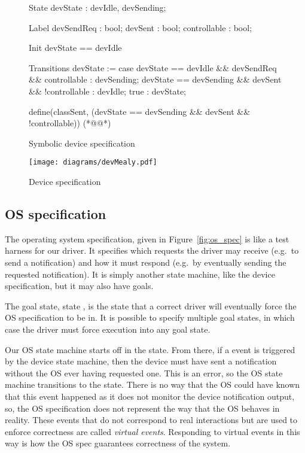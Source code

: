\begin{figure}
\centering
\begin{asllisting}
State
devState : {devIdle, devSending};

Label
devSendReq   : bool;
devSent      : bool;
controllable : bool;

Init
devState == devIdle

Transitions
devState := case {
    devState == devIdle && devSendReq && controllable  : devSending;
    devState == devSending && devSent && !controllable : devIdle;
    true                                               : devState;
}

define(classSent, (devState == devSending && devSent && !controllable)) (*@\label{fig:dev_spec:l:output}@*)

\end{asllisting}
\caption{Symbolic device specification}
\label{fig:dev_spec_asl}
\end{figure}

\begin{figure}
\centering
\texttt{[image: diagrams/devMealy.pdf]}
\caption{Device specification}
\label{fig:dev_spec_mealy}
\end{figure}

\subsection{OS specification}

The operating system specification, given in Figure~\ref{fig:os_spec} is like a test harness for our driver. It specifies which requests the driver may receive (e.g.\ to send a notification) and how it must respond (e.g.\ by eventually sending the requested notification). It is simply another state machine, like the device specification, but it may also have goals.

The goal state, state , is the state that a correct driver will eventually force the OS specification to be in. It is possible to specify multiple goal states, in which case the driver must force execution into any goal state.

Our OS state machine starts off in the  state. From there, if a  event is triggered by the device state machine, then the device must have sent a notification without the OS ever having requested one. This is an error, so the OS state machine transitions to the  state. There is no way that the OS could have known that this event happened as it does not monitor the device notification output, so, the OS specification does not represent the way that the OS behaves in reality. These events that do not correspond to real interactions but are used to enforce correctness are called \emph{virtual events}. Responding to virtual events in this way is how the OS spec guarantees correctness of the system. 

